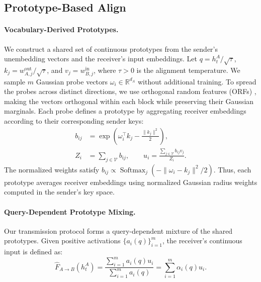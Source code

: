 \documentclass[11pt]{article}
\begin{document}
\subsection{Prototype-Based Align}
\label{sec:prototype_alignment}

\paragraph{Vocabulary-Derived Prototypes.}
We construct a shared set of continuous prototypes from the sender's unembedding vectors and the receiver's input embeddings. Let $q=h_t^A/\sqrt{\tau}$, $k_j=w_{A,j}^{\mathrm{out}}/\sqrt{\tau}$, and $v_j=w_{B,j}^{\mathrm{in}}$, where $\tau>0$ is the alignment temperature. We sample $m$ Gaussian probe vectors $\omega_i\in\mathbb{R}^{d_A}$ without additional training. To spread the probes across distinct directions, we use orthogonal random features (ORFs) \citep{performer}, making the vectors orthogonal within each block while preserving their Gaussian marginals. Each probe defines a prototype by aggregating receiver embeddings according to their corresponding sender keys:
\begin{equation}
\begin{aligned}
    b_{ij}
    &=\exp\!\left(\omega_i^\top k_j-\frac{\|k_j\|^2}{2}\right), \\
    Z_i&=\sum_{j\in\mathcal{V}}b_{ij},
    \qquad
    u_i=\frac{\sum_{j\in\mathcal{V}}b_{ij}v_j}{Z_i}.
\end{aligned}
\label{eq:prototype_construction}
\end{equation}
The normalized weights satisfy $b_{ij} \propto \operatorname{Softmax}_j(-\|\omega_i-k_j\|^2/2)$. Thus, each prototype averages receiver embeddings using normalized Gaussian radius weights computed in the sender's key space.

\paragraph{Query-Dependent Prototype Mixing.}
Our transmission protocol forms a query-dependent mixture of the shared prototypes. Given positive activations $\{a_i(q)\}_{i=1}^{m}$, the receiver's continuous input is defined as:
\begin{equation}
    \widehat{F}_{A\rightarrow B}(h_t^A)
    =\frac{\sum_{i=1}^{m}a_i(q)u_i}
            {\sum_{i=1}^{m}a_i(q)}
    =\sum_{i=1}^{m}\alpha_i(q)u_i.
\label{eq:prototype_mixing}
\end{equation}
\end{document}
